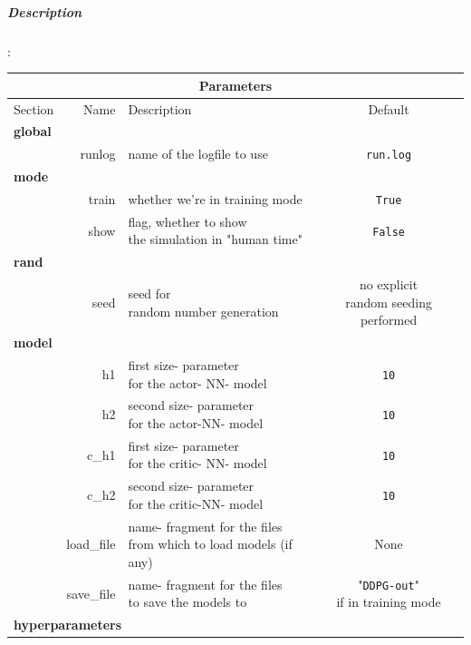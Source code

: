\documentclass[a4paper]{article}
\begin{document}
\subparagraph{Description}
:\\
\small
\begin{tabular}{ |l|r|l|c| }
  \hline
  \multicolumn{4}{|c|}{Parameters} \\
  \hline
Section & Name & Description & Default \\
  \hline
\multicolumn{4}{|l|}{\textbf{global}} \\
               & runlog & name of the logfile to use & \texttt{run.log} \\
\multicolumn{4}{|l|}{\textbf{mode}} \\
               & train & whether we're in training mode & \texttt{True} \\
               & show & \makecell[tl]{flag, whether to show \\ the simulation in "human time"} & \texttt{False} \\
\multicolumn{4}{|l|}{\textbf{rand}} \\
               & seed & \makecell[tl]{seed for \\ random number generation} & \makecell[tc]{no explicit \\ random seeding performed} \\
\multicolumn{4}{|l|}{\textbf{model}} \\
               & h1 & \makecell[tl]{first size- parameter \\ for the actor- NN- model} & \texttt{10} \\
               & h2 & \makecell[tl]{second size- parameter \\ for the actor-NN- model} & \texttt{10} \\
               & c\_h1 & \makecell[tl]{first size- parameter \\ for the critic- NN- model} & \texttt{10} \\
               & c\_h2 & \makecell[tl]{second size- parameter \\ for the critic-NN- model} & \texttt{10} \\
               & load\_file & \makecell[tl]{name- fragment for the files \\ from which to load models (if any)} & None \\
               & save\_file & \makecell[tl]{name- fragment for the files \\ to save the models to} & \makecell[tc]{"\texttt{DDPG-out}" \\ if in training mode} \\
\multicolumn{4}{|l|}{\textbf{hyperparameters}} \\

\end{tabular}
\end{document}
